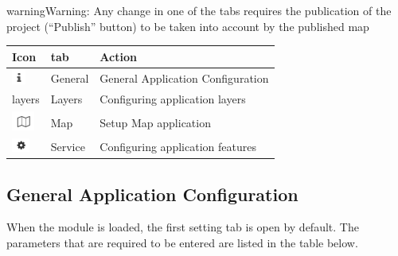 \documentclass[letterpaper,10pt,english]{sphinxmanual}
\begin{document}
\begin{notice}{warning}{Warning:}
Any change in one of the tabs requires the publication of the project (``Publish'' button) to be taken into account by the published map
\end{notice}

\begin{tabulary}{\linewidth}{|L|L|L|}
\hline

\textbf{Icon}
 & 
\textbf{tab}
 & 
\textbf{Action}
\\
\hline
\includegraphics{info.png}
 & 
General
 & 
General Application Configuration
\\
\hline
{\color{red}\bfseries{}\textbar{}}layers \textbar{}
 & 
Layers
 & 
Configuring application layers
\\
\hline
\includegraphics{map.png}
 & 
Map
 & 
Setup Map application
\\
\hline
\includegraphics{process.png}
 & 
Service
 & 
Configuring application features
\\
\hline\end{tabulary}



\subsection{General Application Configuration}
\label{apps/appconfig:configuration-generale-de-l-application}
When the module is loaded, the first setting tab is open by default. The parameters that are required to be entered are listed in the table below.
\end{document}
